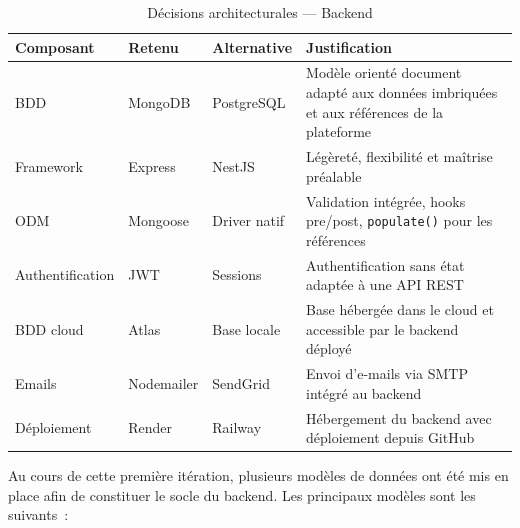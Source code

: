 \begin{table}[H]
  \centering
  \begin{tabularx}{\textwidth}{lllX}
    \toprule
    \textbf{Composant} & \textbf{Retenu} & \textbf{Alternative} & \textbf{Justification} \\
    \midrule
    BDD & MongoDB & PostgreSQL & Modèle orienté document adapté aux données
                              imbriquées et aux références de la plateforme \\
    Framework & Express & NestJS & Légèreté, flexibilité et maîtrise préalable \\
    ODM & Mongoose  & Driver natif & Validation intégrée, hooks pre/post,
                                           \texttt{populate()} pour les références \\
    Authentification & JWT & Sessions & Authentification sans état adaptée
                                    à une API REST \\

    BDD cloud & Atlas & Base locale & Base hébergée dans le cloud et accessible
                                  par le backend déployé \\

    Emails & Nodemailer & SendGrid & Envoi d'e-mails via SMTP intégré au backend \\

    Déploiement & Render & Railway & Hébergement du backend avec déploiement
                                 depuis GitHub \\
    \bottomrule
  \end{tabularx}
  \caption{Décisions architecturales --- Backend}
  \label{tab:archi_decisions_backend}
\end{table}

Au cours de cette première itération, plusieurs modèles de données ont été mis en
place afin de constituer le socle du backend. Les principaux modèles sont les suivants~:


